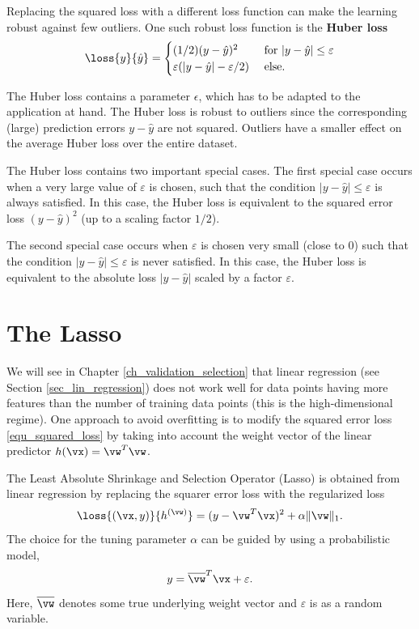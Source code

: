 \documentclass[12pt]{report}
\begin{document}
Replacing the squared loss with a different loss function can 
make the learning robust against few outliers. One such robust 
loss function is the {\bf Huber loss} \cite{HuberRobustBook}
\begin{equation}
\loss{y}{\hat{y}} = \begin{cases} (1/2) (y-\hat{y})^{2} & \mbox{ for } |y-\hat{y}| \leq   \varepsilon \\ 
\varepsilon(|y-\hat{y}| - \varepsilon/2) & \mbox{ else. }\end{cases}
\end{equation}

The Huber loss contains a parameter $\epsilon$, which has to 
be adapted to the application at hand. The Huber loss is robust 
to outliers since the corresponding (large) prediction errors 
$y - \hat{y}$ are not squared. Outliers have a smaller effect 
on the average Huber loss over the entire dataset. 

The Huber loss contains two important special cases. 
The first special case occurs when a very large value of $\varepsilon$ 
is chosen, such that the condition $|y-\hat{y}| \leq \varepsilon$ is 
always satisfied. In this case, the Huber loss is equivalent to the 
squared error loss $(y-\hat{y})^{2}$ (up to a scaling factor $1/2$). 

The second special case occurs when $\varepsilon$ is chosen 
very small (close to $0$) such that the condition $|y-\hat{y}| \leq \varepsilon$ 
is never satisfied. In this case, the Huber loss is equivalent 
to the absolute loss $|y - \hat{y}|$ scaled by a factor $\varepsilon$.

\section{The  Lasso}
\label{sec_lasso}
We will see in Chapter \ref{ch_validation_selection} that linear 
regression (see Section \ref{sec_lin_regression}) does not work 
well for data points having more features than the number of 
training data points (this is the high-dimensional regime). 
One approach to avoid overfitting is to modify the squared error 
loss \eqref{equ_squared_loss} by taking into account the weight 
vector of the linear predictor $h(\vx) = \vw^{T}\vw$. 

The Least Absolute Shrinkage and Selection Operator (Lasso) is 
obtained from linear regression by replacing the squarer error loss 
with the regularized loss 
\begin{equation}
\loss{(\vx,y)}{h^{(\vw)}} = (y-\vw^{T}\vx)^{2} + \alpha \| \vw \|_{1}. 
\end{equation}
The choice for the tuning parameter $\alpha$ can be guided 
by using a probabilistic model, 
$$ y = \overline{\vw}^{T} \vx + \varepsilon.$$ 
Here, $\overline{\vw}$ denotes some true underlying weight vector 
and $\varepsilon$ is as a random variable. 
\end{document}
